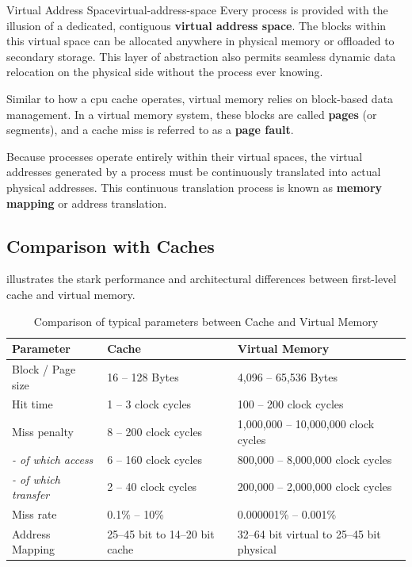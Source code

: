 \begin{concept}{Virtual Address Space}{virtual-address-space}
    Every process is provided with the illusion of a dedicated, contiguous \textbf{virtual address space}. The blocks within this virtual space can be allocated anywhere in physical memory or offloaded to secondary storage. This layer of abstraction also permits seamless dynamic data relocation on the physical side without the process ever knowing.
\end{concept}

Similar to how a \gls{cpu} cache operates, virtual memory relies on block-based data management. In a virtual memory system, these blocks are called \textbf{pages} (or segments), and a cache miss is referred to as a \textbf{page fault}. 

Because processes operate entirely within their virtual spaces, the virtual addresses generated by a process must be continuously translated into actual physical addresses. This continuous translation process is known as \textbf{memory mapping} or address translation.

\subsection{Comparison with Caches}

 illustrates the stark performance and architectural differences between first-level cache and virtual memory. 

\begin{table}[htb!]
    \centering
    \renewcommand{\arraystretch}{1.2}
    \begin{tabular}{l l l}
        \hline
        \textbf{Parameter} & \textbf{Cache} & \textbf{Virtual Memory}\\
        \hline 
        Block / Page size & 16 -- 128 Bytes & 4,096 -- 65,536 Bytes\\
        Hit time & 1 -- 3 clock cycles & 100 -- 200 clock cycles \\
        Miss penalty & 8 -- 200 clock cycles & 1,000,000 -- 10,000,000 clock cycles \\
        \hspace{3mm} \textit{- of which access} & 6 -- 160 clock cycles & 800,000 -- 8,000,000 clock cycles\\
        \hspace{3mm} \textit{- of which transfer} & 2 -- 40 clock cycles & 200,000 -- 2,000,000 clock cycles \\
        Miss rate & 0.1\% -- 10\% & 0.000001\% -- 0.001\% \\
        Address Mapping & 25--45 bit to 14--20 bit cache & 32--64 bit virtual to 25--45 bit physical \\
        \hline
    \end{tabular}
    \caption{Comparison of typical parameters between Cache and Virtual Memory}
    \label{tab:cache-vs-virtual-memory}
\end{table}

